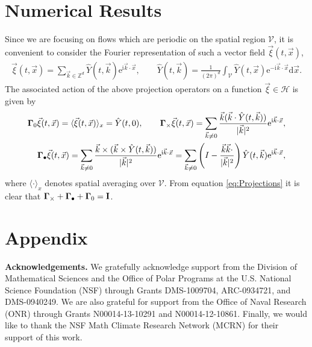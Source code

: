 \documentclass[11pt]{amsart}
\newcommand{\I}{\mathrm{i}}
\newcommand{\e}{\mathrm{e}}
\renewcommand{\d}{\mathrm{d}}
\newcommand{\Ib}{\mathbf{I}}
\newcommand{\Vc}{\mathcal{V}}
\newcommand{\Hs}{\mathscr{H}}
\newcommand\bGamma{\mbox{\boldmath${\Gamma}$}}
\begin{document}
\section{Numerical Results}\label{sec:Num_Results}
%
Since we are focusing on flows which are periodic on the spatial
region $\Vc$, it is convenient to consider the Fourier
representation of such a vector field $\vec{\xi}(t,\vec{x})$, 
%
\begin{align}
  \vec{\xi}(t,\vec{x})
    =\sum_{\vec{k}\in\mathbb{Z}^d}
       \hat{Y}(t,\vec{k})\e^{\I\vec{k}\cdot\vec{x}},
  \qquad
  \hat{Y}(t,\vec{k})
    =\frac{1}{(2\pi)^d}\int_{\Vc}
       \hat{Y}(t,\vec{x})\e^{-\I\vec{k}\cdot\vec{x}} \d\vec{x}.
\end{align}
%
The associated action of the above projection operators on a function
$\vec{\xi}\in\Hs$ is given by \cite{Fannjiang:SIAM_JAM:333} 
%
\begin{align}\label{eq:Projections}
  \bGamma_0\vec{\xi}(t,\vec{x})
    =\langle\vec{\xi}(t,\vec{x})\rangle_x
    =\hat{Y}(t,0),
    \qquad
  \bGamma_\times\vec{\xi}(t,\vec{x})
    =\sum_{\vec{k}\neq0}
       \frac{\vec{k}(\vec{k}\cdot\hat{Y}(t,\vec{k}))}{|\vec{k}|^2}
       \e^{\I\vec{k}\cdot\vec{x}},
    \\
  \bGamma_\bullet\vec{\xi}(t,\vec{x})
    =\sum_{\vec{k}\neq0}
       \frac{\vec{k}\times(\vec{k}\times\hat{Y}(t,\vec{k}))}{|\vec{k}|^2}
       \e^{\I\vec{k}\cdot\vec{x}}
    =\sum_{\vec{k}\neq0}\left(I-
       \frac{\vec{k}\vec{k}\cdot}{|\vec{k}|^2}\right) 
       \hat{Y}(t,\vec{k})  \e^{\I\vec{k}\cdot\vec{x}},
       \notag
\end{align}
%
where $\langle\cdot\rangle_x$ denotes spatial averaging over $\Vc$. From
equation \eqref{eq:Projections} it is clear that
$\bGamma_\times+\bGamma_\bullet+\bGamma_0=\Ib$. 


  \setcounter{equation}{1}  %
  \setcounter{section}{0}  %
  \renewcommand{\theequation}{A-\arabic{equation}} 
\renewcommand{\thesection}{A-\arabic{section}}
%
\section{Appendix} 
\label{sec:Appendix}
%


\medskip

{\bf Acknowledgements.}
We gratefully acknowledge support from the Division of Mathematical
Sciences and the Office of Polar Programs at the U.S. 
National Science Foundation (NSF) through Grants
DMS-1009704, ARC-0934721, and DMS-0940249. We are also grateful for 
support from the Office of Naval Research (ONR) through
Grants N00014-13-10291 and N00014-12-10861. Finally, we would like to 
thank the NSF Math Climate Research Network (MCRN) for their support
of this work. 


\medskip



\end{document}
